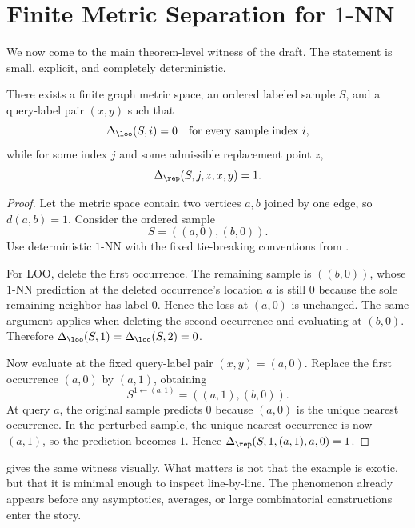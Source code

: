 \section[Finite Metric Separation for 1-NN]{Finite Metric Separation for $1$-NN}
\label{sec:finite-separation}

We now come to the main theorem-level witness of the draft. The statement is
small, explicit, and completely deterministic.

\begin{proposition}
\label{prop:two-point-separation}
There exists a finite graph metric space, an ordered labeled sample $S$, and a
query-label pair $(x,y)$ such that
\[
\Delta_{\loo}(S,i)=0 \quad\text{for every sample index } i,
\]
while for some index $j$ and some admissible replacement point $z$,
\[
\Delta_{\rep}(S,j,z,x,y)=1.
\]
\end{proposition}

\begin{proof}
Let the metric space contain two vertices $a,b$ joined by one edge, so
$d(a,b)=1$. Consider the ordered sample
\[
S=((a,0),(b,0)).
\]
Use deterministic $1$-NN with the fixed tie-breaking conventions from
.

For LOO, delete the first occurrence. The remaining sample is $((b,0))$, whose
$1$-NN prediction at the deleted occurrence's location $a$ is still $0$ because
the sole remaining neighbor has label $0$. Hence the loss at $(a,0)$ is
unchanged. The same argument applies when deleting the second occurrence and
evaluating at $(b,0)$. Therefore $\Delta_{\loo}(S,1)=\Delta_{\loo}(S,2)=0$.

Now evaluate at the fixed query-label pair $(x,y)=(a,0)$. Replace the first
occurrence $(a,0)$ by $(a,1)$, obtaining
\[
S^{1\leftarrow (a,1)}=((a,1),(b,0)).
\]
At query $a$, the original sample predicts $0$ because $(a,0)$ is the unique
nearest occurrence. In the perturbed sample, the unique nearest occurrence is
now $(a,1)$, so the prediction becomes $1$. Hence
$\Delta_{\rep}(S,1,(a,1),a,0)=1$.
\end{proof}

 gives the same witness visually. What matters is not
that the example is exotic, but that it is minimal enough to inspect
line-by-line. The phenomenon already appears before any asymptotics, averages,
or large combinatorial constructions enter the story.



